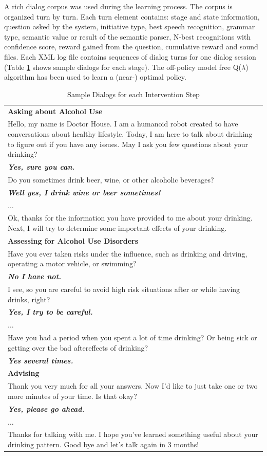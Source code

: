 \documentclass[letterpaper]{article}
\begin{document}
A rich dialog corpus was used during the learning process. The corpus is organized turn by 
turn. Each turn element contains: stage and state information, question asked by the system,  
initiative type,  best speech recognition, grammar type, semantic value or result of the semantic 
parser, N-best recognitions with confidence score, reward gained from the question, cumulative 
reward and sound files. Each XML log file contains sequences of dialog turns for one dialog 
session (Table \ref{sampleDialog} shows  sample dialogs for each stage). The off-policy model free 
Q($\lambda$) algorithm has been used to learn a (near-) optimal policy.

\begin{table}[!h]
\caption{Sample Dialogs for each Intervention Step}
\label{sampleDialog}
\begin{tabular}{ p{80mm}  } \hline
    \textbf{Asking about Alcohol Use} \\
    Hello, my name is Doctor House. I am a humanoid robot created to have conversations about 
healthy lifestyle. Today, I am here to talk about drinking to figure out if you have any issues.  
May I ask you few questions about your drinking? \\
\bf{\em{Yes, sure you can.}}\\
Do you sometimes drink beer, wine, or other alcoholic beverages?\\
\bf{\em{Well yes, I drink wine or beer sometimes!}} \\
$\ldots$\\
Ok, thanks for the information you have provided to me about your drinking. Next, I will try to 
determine some important effects of your drinking. \\
    \hline
    \textbf{Assessing for Alcohol Use Disorders} \\
    Have you ever taken risks under the influence, such as drinking and driving, operating a motor 
vehicle, or swimming?\\
\bf{\em{No I have not.}} \\
I see, so you are careful to avoid high risk situations after or while having drinks, right?\\
\bf{\em{Yes, I try to be careful.}} \\
$\ldots$\\
Have you had a period when you spent a lot of time drinking? Or being sick or getting over the bad 
aftereffects of drinking? \\
\bf{\em{Yes several times.}} \\
    \hline
    \textbf{Advising} \\
     Thank you very much for all your answers. Now I'd like to just take one or two more minutes of 
your time. Is that okay? \\
\bf{\em{Yes, please go ahead.}}\\
$\ldots$\\
Thanks for talking with me. I hope you've learned something useful about your drinking pattern.  
Good bye and let's talk again in 3 months! \\
    \hline
\end{tabular}
\end{table}
\end{document}
